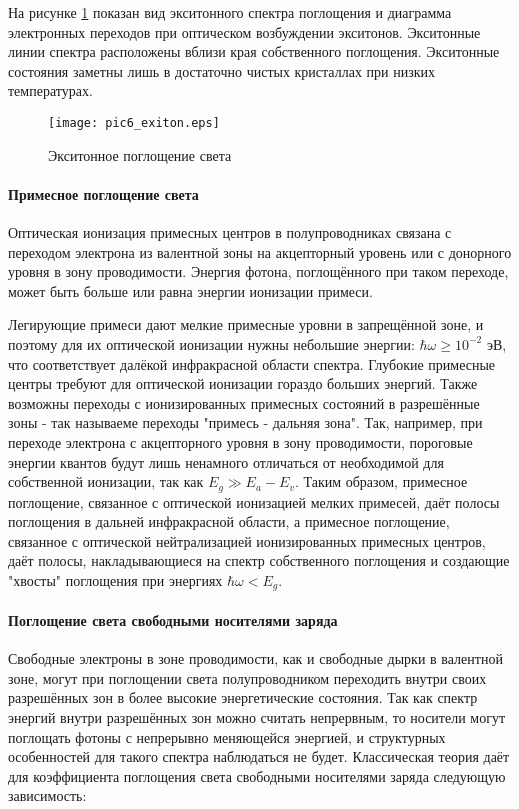 На рисунке \ref{pic6_exiton} показан вид экситонного спектра поглощения и диаграмма электронных переходов при оптическом возбуждении экситонов. Экситонные линии спектра расположены вблизи края собственного поглощения. Экситонные состояния заметны лишь в достаточно чистых кристаллах при низких температурах.

\begin{figure}[h!]\centering
\texttt{[image: pic6\_exiton.eps]}
\caption{Экситонное поглощение света}
\label{pic6_exiton}
\end{figure}

\paragraph{Примесное поглощение света}
Оптическая ионизация примесных центров в полупроводниках связана с переходом электрона из валентной зоны на акцепторный уровень или с донорного уровня в зону проводимости. Энергия фотона, поглощённого при таком переходе, может быть больше или равна энергии ионизации примеси.

Легирующие примеси дают мелкие примесные уровни в запрещённой зоне, и поэтому для их оптической ионизации нужны небольшие энергии: $\hbar \omega \ge 10^{-2}$ эВ, что соответствует далёкой инфракрасной области спектра. Глубокие примесные центры требуют для оптической ионизации гораздо больших энергий. Также возможны переходы с ионизированных примесных состояний в разрешённые зоны - так называеме переходы "примесь - дальняя зона". Так, например, при переходе электрона с акцепторного уровня в зону проводимости, пороговые энергии квантов будут лишь ненамного отличаться от необходимой для собственной ионизации, так как $E_{g} \gg E_{a}-E_{v}$. Таким образом, примесное поглощение, связанное с оптической ионизацией мелких примесей, даёт полосы поглощения в дальней инфракрасной области, а примесное поглощение, связанное с оптической нейтрализацией ионизированных примесных центров, даёт полосы, накладывающиеся на спектр собственного поглощения и создающие "хвосты" поглощения при энергиях $\hbar \omega < E_{g}$.

\paragraph{Поглощение света свободными носителями заряда}
Свободные электроны в зоне проводимости, как и свободные дырки в валентной зоне, могут при поглощении света полупроводником переходить внутри своих разрешённых зон в более высокие энергетические состояния. Так как спектр энергий внутри разрешённых зон можно считать непрервным, то носители могут поглощать фотоны с непрерывно меняющейся энергией, и структурных особенностей для такого спектра наблюдаться не будет. Классическая теория даёт для коэффициента поглощения света свободными носителями заряда следующую зависимость:

